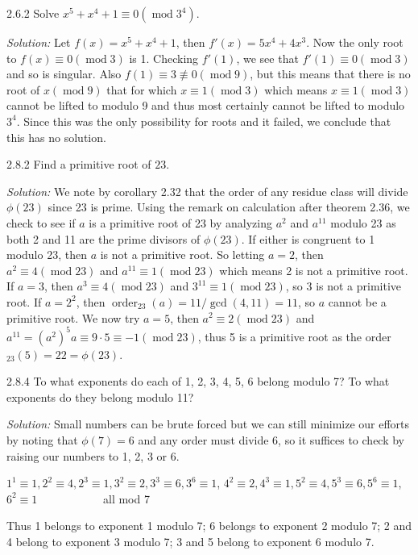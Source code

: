 \documentclass{letter}
\newcommand{\nequiv}{\not\equiv}
\newcommand{\tmem}[1]{{\em #1\/}}
\newcommand{\tmop}[1]{\ensuremath{\operatorname{#1}}}
\begin{document}
2.6.2 Solve $x^5 + x^4 + 1 \equiv 0 (\tmop{mod} 3^4)$.

{\tmem{Solution:}} Let $f (x) = x^5 + x^4 + 1$, then $f' (x) = 5 x^4 + 4 x^3$.
Now the only root to $f (x) \equiv 0 (\tmop{mod} 3)$ is 1. Checking $f' (1)$,
we see that $f' (1) \equiv 0 (\tmop{mod} 3)$ and so is singular. Also $f (1)
\equiv 3 \nequiv 0 (\tmop{mod} 9)$, but this means that there is no root of $x
(\tmop{mod} 9)$ that for which $x \equiv 1 (\tmop{mod} 3)$ which means $x
\equiv 1 (\tmop{mod} 3)$ cannot be lifted to modulo 9 and thus most certainly
cannot be lifted to modulo $3^4$. Since this was the only possibility for
roots and it failed, we conclude that this has no solution.

2.8.2 Find a primitive root of $23$.

{\tmem{Solution:}} We note by corollary 2.32 that the order of any residue
class will divide $\phi (23)$ since 23 is prime. Using the remark on
calculation after theorem 2.36, we check to see if $a$ is a primitive root of
23 by analyzing $a^2$ and $a^{11}$ modulo 23 as both 2 and 11 are the prime
divisors of $\phi (23)$. If either is congruent to 1 modulo 23, then $a$ is
not a primitive root. So letting $a = 2$, then $a^2 \equiv 4 (\tmop{mod} 23)$
and $a^{11} \equiv 1 (\tmop{mod} 23)$ which means 2 is not a primitive root.
If $a = 3$, then $a^3 \equiv 4 (\tmop{mod} 23)$ and $3^{11} \equiv 1
(\tmop{mod} 23)$, so 3 is not a primitive root. If $a = 2^2$, then
$\tmop{order}_{23} (a) = 11 / \gcd (4, 11) = 11$, so $a$ cannot be a primitive
root. We now try $a = 5$, then $a^2 \equiv 2 (\tmop{mod} 23)$ and $a^{11} =
(a^2)^5 a \equiv 9 \cdot 5 \equiv - 1 (\tmop{mod} 23)$, thus 5 is a primitive
root as the order$_{23} (5) = 22 = \phi (23)$.

2.8.4 To what exponents do each of 1, 2, 3, 4, 5, 6 belong modulo 7? To what
exponents do they belong modulo 11?

{\tmem{Solution:}} Small numbers can be brute forced but we can still minimize
our efforts by noting that $\phi (7) = 6$ and any order must divide 6, so it
suffices to check by raising our numbers to 1, 2, 3 or 6.

$1^1 \equiv 1, 2^2 \equiv 4, 2^3 \equiv 1, 3^2 \equiv 2, 3^3 \equiv 6, 3^6
\equiv 1$, $4^2 \equiv 2, 4^3 \equiv 1, 5^2 \equiv 4, 5^3 \equiv 6, 5^6 \equiv
1$, $6^2 \equiv 1$ \ \ \ \ \ \ \ \ \ \ \ all mod 7

Thus 1 belongs to exponent 1 modulo 7; 6 belongs to exponent 2 modulo 7; 2 and
4 belong to exponent 3 modulo 7; 3 and 5 belong to exponent 6 modulo 7.
\end{document}
